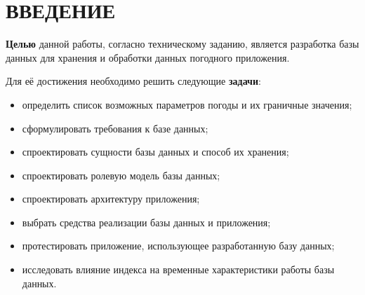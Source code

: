 \chapter*{ВВЕДЕНИЕ}

\textbf{Целью} данной работы, согласно техническому заданию, является разработка базы данных для хранения и обработки данных погодного приложения.

Для её достижения необходимо решить следующие \textbf{задачи}:
\begin{itemize}
    \item определить список возможных параметров погоды и их граничные значения;
    \item сформулировать требования к базе данных;
    \item спроектировать сущности базы данных и способ их хранения;
    \item спроектировать ролевую модель базы данных;
    \item спроектировать архитектуру приложения;
    \item выбрать средства реализации базы данных и приложения;
    \item протестировать приложение, использующее разработанную базу данных;
    \item исследовать влияние индекса на временные характеристики работы базы данных.
\end{itemize}